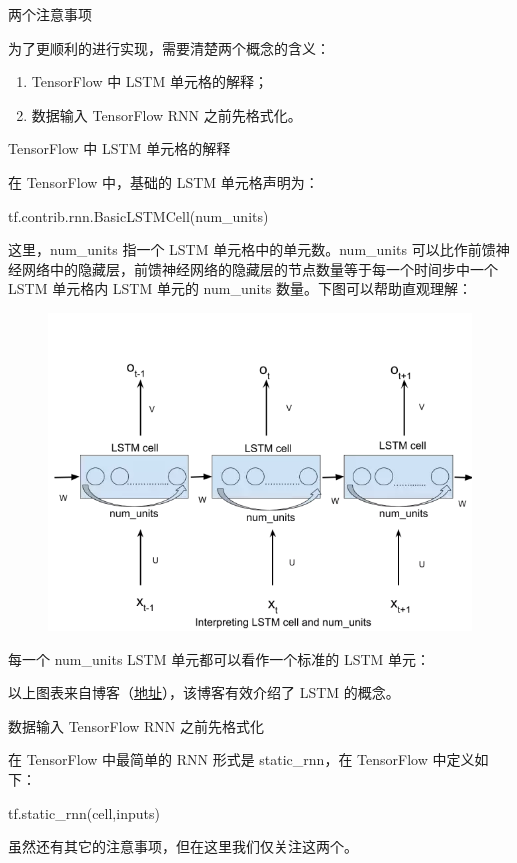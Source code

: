 \documentclass{article}
\begin{document}
两个注意事项

为了更顺利的进行实现，需要清楚两个概念的含义：
\begin{enumerate}
\item TensorFlow 中 LSTM 单元格的解释；
\item 数据输入 TensorFlow RNN 之前先格式化。
\end{enumerate}

TensorFlow 中 LSTM 单元格的解释

在 TensorFlow 中，基础的 LSTM 单元格声明为：

tf.contrib.rnn.BasicLSTMCell(num\_units)


这里，num\_units 指一个 LSTM 单元格中的单元数。num\_units 可以比作前馈神经网络中的隐藏层，前馈神经网络的隐藏层的节点数量等于每一个时间步中一个 LSTM 单元格内 LSTM 单元的 num\_units 数量。下图可以帮助直观理解：

\begin{figure}[H]
	\includegraphics[scale=0.5]{lstm_unit.png}
\end{figure}
每一个 num\_units LSTM 单元都可以看作一个标准的 LSTM 单元：


以上图表来自博客（\href{http://colah.github.io/posts/2015-08-Understanding-LSTMs/}{地址}），该博客有效介绍了 LSTM 的概念。

数据输入 TensorFlow RNN 之前先格式化

在 TensorFlow 中最简单的 RNN 形式是 static\_rnn，在 TensorFlow 中定义如下：

tf.static\_rnn(cell,inputs)


虽然还有其它的注意事项，但在这里我们仅关注这两个。
\end{document}
